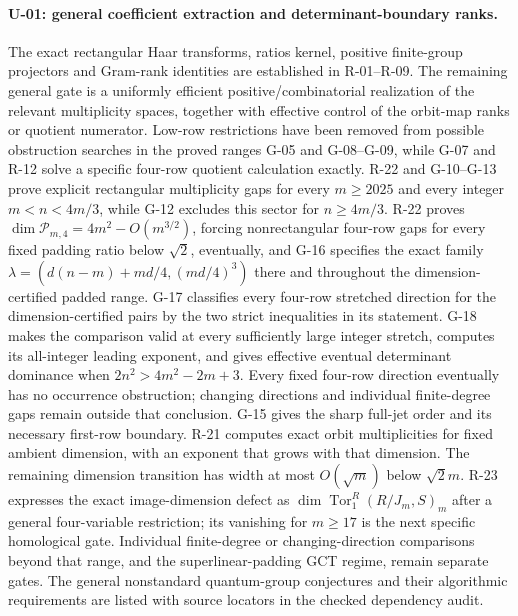 \documentclass[11pt,a4paper]{article}
\theoremstyle{definition}\newtheorem{definition}{Definition}
\begin{document}
\paragraph{U-01: general coefficient extraction and determinant-boundary ranks.}
The exact rectangular Haar transforms, ratios kernel, positive finite-group projectors and Gram-rank identities are established in R-01--R-09. The remaining general gate is a uniformly efficient positive/combinatorial realization of the relevant multiplicity spaces, together with effective control of the orbit-map ranks or quotient numerator. Low-row restrictions have been removed from possible obstruction searches in the proved ranges G-05 and G-08--G-09, while G-07 and R-12 solve a specific four-row quotient calculation exactly. R-22 and G-10--G-13 prove explicit rectangular multiplicity gaps for every $m\geq2025$ and every integer $m<n<4m/3$, while G-12 excludes this sector for $n\geq4m/3$. R-22 proves $\dim\mathcal P_{m,4}=4m^2-O(m^{3/2})$, forcing nonrectangular four-row gaps for every fixed padding ratio below $\sqrt2$, eventually, and G-16 specifies the exact family $\lambda=(d(n-m)+md/4,(md/4)^3)$ there and throughout the dimension-certified padded range. G-17 classifies every four-row stretched direction for the dimension-certified pairs by the two strict inequalities in its statement. G-18 makes the comparison valid at every sufficiently large integer stretch, computes its all-integer leading exponent, and gives effective eventual determinant dominance when $2n^2>4m^2-2m+3$. Every fixed four-row direction eventually has no occurrence obstruction; changing directions and individual finite-degree gaps remain outside that conclusion. G-15 gives the sharp full-jet order and its necessary first-row boundary. R-21 computes exact orbit multiplicities for fixed ambient dimension, with an exponent that grows with that dimension. The remaining dimension transition has width at most $O(\sqrt m)$ below $\sqrt2m$. R-23 expresses the exact image-dimension defect as $\dim\operatorname{Tor}_1^R(R/J_m,S)_m$ after a general four-variable restriction; its vanishing for $m\geq17$ is the next specific homological gate. Individual finite-degree or changing-direction comparisons beyond that range, and the superlinear-padding GCT regime, remain separate gates. The general nonstandard quantum-group conjectures and their algorithmic requirements are listed with source locators in the checked dependency audit.
\end{document}
